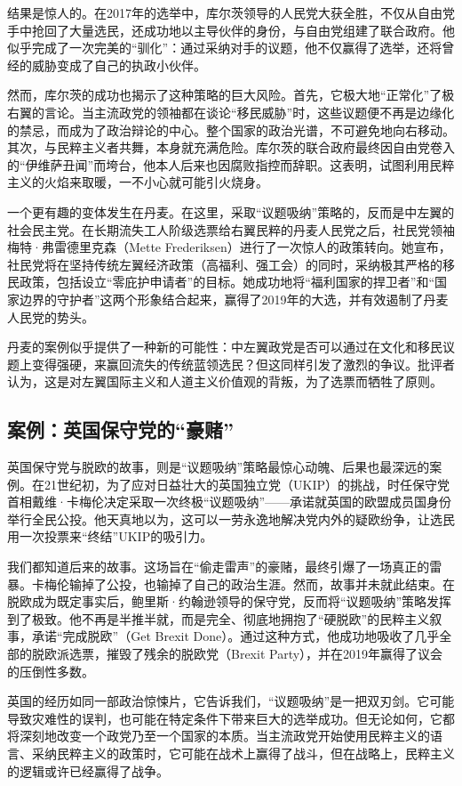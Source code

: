 结果是惊人的。在2017年的选举中，库尔茨领导的人民党大获全胜，不仅从自由党手中抢回了大量选民，还成功地以主导伙伴的身份，与自由党组建了联合政府。他似乎完成了一次完美的“驯化”：通过采纳对手的议题，他不仅赢得了选举，还将曾经的威胁变成了自己的执政小伙伴。

然而，库尔茨的成功也揭示了这种策略的巨大风险。首先，它极大地“正常化”了极右翼的言论。当主流政党的领袖都在谈论“移民威胁”时，这些议题便不再是边缘化的禁忌，而成为了政治辩论的中心。整个国家的政治光谱，不可避免地向右移动。其次，与民粹主义者共舞，本身就充满危险。库尔茨的联合政府最终因自由党卷入的“伊维萨丑闻”而垮台，他本人后来也因腐败指控而辞职。这表明，试图利用民粹主义的火焰来取暖，一不小心就可能引火烧身。

一个更有趣的变体发生在丹麦。在这里，采取“议题吸纳”策略的，反而是中左翼的社会民主党。在长期流失工人阶级选票给右翼民粹的丹麦人民党之后，社民党领袖梅特·弗雷德里克森（Mette Frederiksen）进行了一次惊人的政策转向。她宣布，社民党将在坚持传统左翼经济政策（高福利、强工会）的同时，采纳极其严格的移民政策，包括设立“零庇护申请者”的目标。她成功地将“福利国家的捍卫者”和“国家边界的守护者”这两个形象结合起来，赢得了2019年的大选，并有效遏制了丹麦人民党的势头。

丹麦的案例似乎提供了一种新的可能性：中左翼政党是否可以通过在文化和移民议题上变得强硬，来赢回流失的传统蓝领选民？但这同样引发了激烈的争议。批评者认为，这是对左翼国际主义和人道主义价值观的背叛，为了选票而牺牲了原则。

\subsection{案例：英国保守党的“豪赌”}

英国保守党与脱欧的故事，则是“议题吸纳”策略最惊心动魄、后果也最深远的案例。在21世纪初，为了应对日益壮大的英国独立党（UKIP）的挑战，时任保守党首相戴维·卡梅伦决定采取一次终极“议题吸纳”——承诺就英国的欧盟成员国身份举行全民公投。他天真地以为，这可以一劳永逸地解决党内外的疑欧纷争，让选民用一次投票来“终结”UKIP的吸引力。

我们都知道后来的故事。这场旨在“偷走雷声”的豪赌，最终引爆了一场真正的雷暴。卡梅伦输掉了公投，也输掉了自己的政治生涯。然而，故事并未就此结束。在脱欧成为既定事实后，鲍里斯·约翰逊领导的保守党，反而将“议题吸纳”策略发挥到了极致。他不再是半推半就，而是完全、彻底地拥抱了“硬脱欧”的民粹主义叙事，承诺“完成脱欧”（Get Brexit Done）。通过这种方式，他成功地吸收了几乎全部的脱欧派选票，摧毁了残余的脱欧党（Brexit Party），并在2019年赢得了议会的压倒性多数。

英国的经历如同一部政治惊悚片，它告诉我们，“议题吸纳”是一把双刃剑。它可能导致灾难性的误判，也可能在特定条件下带来巨大的选举成功。但无论如何，它都将深刻地改变一个政党乃至一个国家的本质。当主流政党开始使用民粹主义的语言、采纳民粹主义的政策时，它可能在战术上赢得了战斗，但在战略上，民粹主义的逻辑或许已经赢得了战争。

